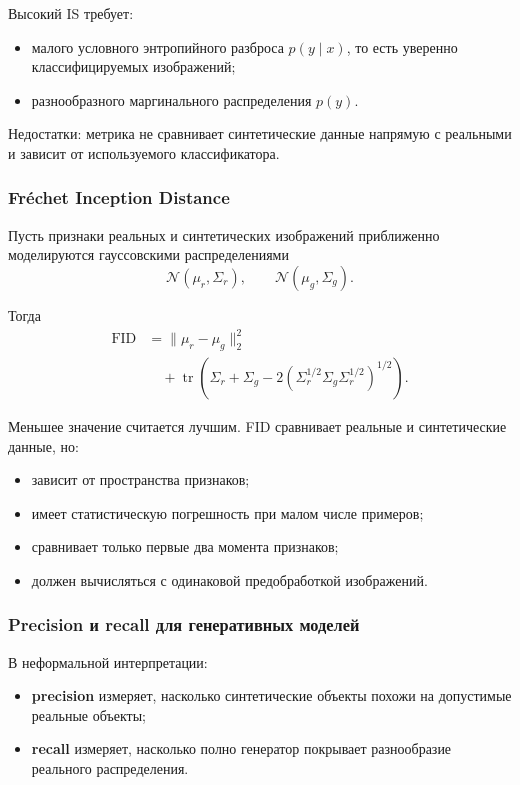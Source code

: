 \documentclass[12pt,a4paper]{article}
\newcommand{\tr}{\operatorname{tr}}
\numberwithin{equation}{section}
\theoremstyle{definition}
\theoremstyle{remark}
\begin{document}
Высокий IS требует:

\begin{itemize}
    \item малого условного энтропийного разброса \(p(y\mid x)\), то
    есть уверенно классифицируемых изображений;
    \item разнообразного маргинального распределения \(p(y)\).
\end{itemize}

Недостатки: метрика не сравнивает синтетические данные напрямую с
реальными и зависит от используемого классификатора.

\subsubsection{Fréchet Inception Distance}

Пусть признаки реальных и синтетических изображений приближенно
моделируются гауссовскими распределениями
\[
    \mathcal{N}(\mu_r,\Sigma_r),
    \qquad
    \mathcal{N}(\mu_g,\Sigma_g).
\]

Тогда
\[
\begin{split}
    \operatorname{FID}
    &=
    \|\mu_r-\mu_g\|_2^2\\
    &\quad+
    \tr\left(
        \Sigma_r+\Sigma_g
        -
        2
        \left(
            \Sigma_r^{1/2}
            \Sigma_g
            \Sigma_r^{1/2}
        \right)^{1/2}
    \right).
\end{split}
\]

Меньшее значение считается лучшим. FID сравнивает реальные и
синтетические данные, но:

\begin{itemize}
    \item зависит от пространства признаков;
    \item имеет статистическую погрешность при малом числе примеров;
    \item сравнивает только первые два момента признаков;
    \item должен вычисляться с одинаковой предобработкой изображений.
\end{itemize}

\subsubsection{Precision и recall для генеративных моделей}

В неформальной интерпретации:

\begin{itemize}
    \item \textbf{precision} измеряет, насколько синтетические объекты
    похожи на допустимые реальные объекты;
    \item \textbf{recall} измеряет, насколько полно генератор
    покрывает разнообразие реального распределения.
\end{itemize}
\end{document}
